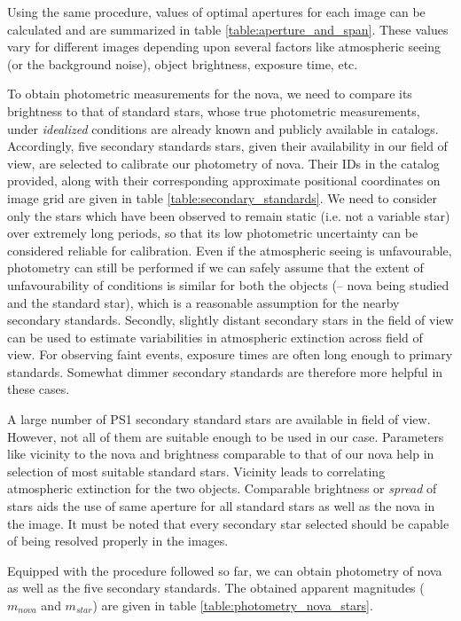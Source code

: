 \documentclass{tda}
\begin{document}
	Using the same procedure, values of optimal apertures for each image can be calculated and are summarized in table \ref{table:aperture_and_span}. These values vary for different images depending upon several factors like atmospheric seeing (or the background noise), object brightness, exposure time, etc.

	To obtain photometric measurements for the nova, we need to compare its brightness to that of standard stars, whose true photometric measurements, under \emph{idealized} conditions are already known and publicly available in catalogs. Accordingly, five secondary standards stars, given their availability in our field of view, are selected to calibrate our photometry of nova. Their IDs in the catalog provided, along with their corresponding approximate positional coordinates on image grid are given in table \ref{table:secondary_standards}. We need to consider only the stars which have been observed to remain static (i.e. not a variable star) over extremely long periods, so that its low photometric uncertainty can be considered reliable for calibration. Even if the atmospheric seeing is unfavourable, photometry can still be performed if we can safely assume that the extent of unfavourability of conditions is similar for both the objects (-- nova being studied and the standard star), which is a reasonable assumption for the nearby secondary standards. Secondly, slightly distant secondary stars in the field of view can be used to estimate variabilities in atmospheric extinction across field of view. For observing faint events, exposure times are often long enough to primary standards. Somewhat dimmer secondary standards are therefore more helpful in these cases.

	A large number of PS1 secondary standard stars are available in field of view. However, not all of them are suitable enough to be used in our case. Parameters like vicinity to the nova and brightness comparable to that of our nova help in selection of most suitable standard stars. Vicinity leads to correlating atmospheric extinction for the two objects. Comparable brightness or \emph{spread} of stars aids the use of same aperture for all standard stars as well as the nova in the image. It must be noted that every secondary star selected should be capable of being resolved properly in the images.

	Equipped with the procedure followed so far, we can obtain photometry of nova as well as the five secondary standards. The obtained apparent magnitudes (\(m_{nova}\) and \(m_{star}\)) are given in table \ref{table:photometry_nova_stars}.
\end{document}
